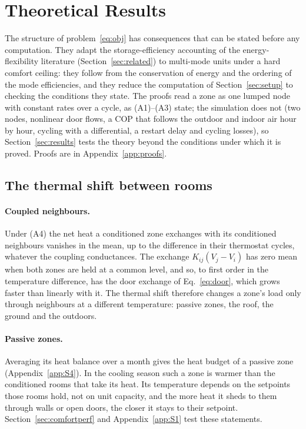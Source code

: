 \documentclass[10pt,a4paper,twocolumn]{article}
\theoremstyle{definition}
\begin{document}
\section{Theoretical Results}\label{sec:theory}
The structure of problem~\eqref{eq:obj} has consequences that can be stated before any computation. They adapt the storage-efficiency accounting of the energy-flexibility literature (Section~\ref{sec:related}) to multi-mode units under a hard comfort ceiling: they follow from the conservation of energy and the ordering of the mode efficiencies, and they reduce the computation of Section~\ref{sec:setup} to checking the conditions they state. The proofs read a zone as one lumped node with constant rates over a cycle, as (A1)--(A3) state; the simulation does not (two nodes, nonlinear door flows, a COP that follows the outdoor and indoor air hour by hour, cycling with a differential, a restart delay and cycling losses), so Section~\ref{sec:results} tests the theory beyond the conditions under which it is proved. Proofs are in Appendix~\ref{app:proofs}.

\subsection{The thermal shift between rooms}\label{sec:passivetheory}
\paragraph{Coupled neighbours.}\label{prop:coupling} Under (A4) the net heat a conditioned zone exchanges with its conditioned neighbours vanishes in the mean, up to the difference in their thermostat cycles, whatever the coupling conductances. The exchange $K_{ij}(V_j-V_i)$ has zero mean when both zones are held at a common level, and so, to first order in the temperature difference, has the door exchange of Eq.~\eqref{eq:door}, which grows faster than linearly with it. The thermal shift therefore changes a zone's load only through neighbours at a different temperature: passive zones, the roof, the ground and the outdoors.

\paragraph{Passive zones.}\label{prop:passive} Averaging its heat balance over a month gives the heat budget of a passive zone (Appendix~\ref{app:S4}). In the cooling season such a zone is warmer than the conditioned rooms that take its heat. Its temperature depends on the setpoints those rooms hold, not on unit capacity, and the more heat it sheds to them through walls or open doors, the closer it stays to their setpoint. Section~\ref{sec:comfortperf} and Appendix~\ref{app:S1} test these statements.
\end{document}
